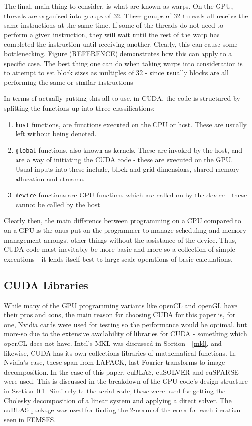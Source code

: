 The final, main thing to consider, is what are known as warps. On the GPU, threads are organised into groups of 32. These groups of 32 threads all receive the same instructions at the same time. If some of the threads do not need to perform a given instruction, they will wait until the rest of the warp has completed the instruction until receiving another. Clearly, this can cause some bottlenecking. Figure (REFERENCE) demonstrates how this can apply to a specific case. The best thing one can do when taking warps into consideration is to attempt to set block sizes as multiples of 32 - since usually blocks are all performing the same or similar instructions.

In terms of actually putting this all to use, in CUDA, the code is structured by splitting the functions up into three classifications:
\begin{enumerate}
	\item \texttt{\twound host\twound} functions, are functions executed on the CPU or host. These are usually left without being denoted.
	\item \texttt{\twound global\twound} functions, also known as kernels. These are invoked by the host, and are a way of initiating the CUDA code - these are executed on the GPU. Usual inputs into these include, block and grid dimensions, shared memory allocation and streams.
	\item \texttt{\twound device\twound} functions are GPU functions which are called on by the device - these cannot be called by the host.
\end{enumerate}
Clearly then, the main difference between programming on a CPU compared to on a GPU is the onus put on the programmer to manage scheduling and memory management amongst other things without the assistance of the device. Thus, CUDA code must inevitably be more basic and more-so a collection of simple executions - it lends itself best to large scale operations of basic calculations.

\subsection{CUDA Libraries}\label{culibs}

While many of the GPU programming variants like openCL and openGL have their pros and cons, the main reason for choosing CUDA for this paper is, for one, Nvidia cards were used for testing so the performance would be optimal, but more-so due to the extensive availability of libraries for CUDA - something which openCL does not have. Intel's MKL was discussed in Section~~\ref{mkl}, and likewise, CUDA has its own collections libraries of mathematical functions. In Nvidia's case, these span from LAPACK, fast-Fourier transforms to image decomposition. In the case of this paper, cuBLAS, cuSOLVER and cuSPARSE were used. This is discussed in the breakdown of the GPU code's design structure in Section~\ref{culibs}. Similarly to the serial code, these were used for getting the Cholesky decomposition of a linear system and applying a direct solver. The cuBLAS package was used for finding the 2-norm of the error for each iteration seen in FEMSES.

